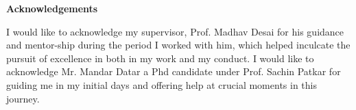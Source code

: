 
\thispagestyle{empty}

\begin{center}
{\Large \textbf{Acknowledgements}}\\%
\end{center}

\setlength{\parindent}{0em}
I would like to acknowledge my supervisor, Prof. Madhav Desai for his guidance and mentor-ship during the period I worked with him, which
helped inculcate the pursuit of excellence in both in my work and my conduct. I would like to acknowledge Mr. Mandar Datar a Phd candidate
under Prof. Sachin Patkar for guiding me in my initial days and offering help at crucial moments in this journey.

\vspace{2cm}

\afterpage{\blankpage}
\clearpage
